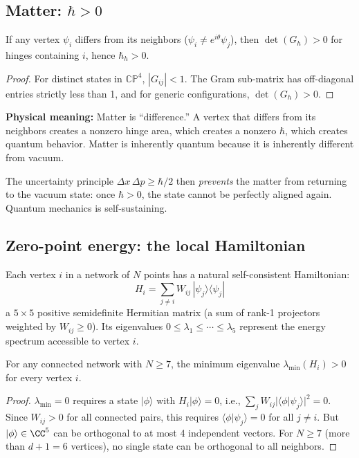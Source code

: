 \subsection{Matter: $\hbar > 0$}

\begin{proposition}
If any vertex $\psi_i$ differs from its neighbors ($\psi_i \neq e^{i\theta}\psi_j$), then $\det(G_h) > 0$ for hinges containing $i$, hence $\hbar_h > 0$.
\end{proposition}

\begin{proof}
For distinct states in $\mathbb{CP}^4$, $|G_{ij}| < 1$. The Gram sub-matrix has off-diagonal entries strictly less than 1, and for generic configurations, $\det(G_h) > 0$.
\end{proof}

\textbf{Physical meaning:} Matter is ``difference.'' A vertex that differs from its neighbors creates a nonzero hinge area, which creates a nonzero $\hbar$, which creates quantum behavior. Matter is inherently quantum because it is inherently different from vacuum.

The uncertainty principle $\Delta x\,\Delta p \geq \hbar/2$ then \emph{prevents} the matter from returning to the vacuum state: once $\hbar > 0$, the state cannot be perfectly aligned again. Quantum mechanics is self-sustaining.

\subsection{Zero-point energy: the local Hamiltonian}

Each vertex $i$ in a network of $N$ points has a natural self-consistent Hamiltonian:
\begin{equation}
H_i = \sum_{j \neq i} W_{ij}\,|\psi_j\rangle\langle\psi_j|
\end{equation}
a $5\times 5$ positive semidefinite Hermitian matrix (a sum of rank-1 projectors weighted by $W_{ij} \geq 0$). Its eigenvalues $0 \leq \lambda_1 \leq \cdots \leq \lambda_5$ represent the energy spectrum accessible to vertex $i$.

\begin{proposition}
For any connected network with $N \geq 7$, the minimum eigenvalue $\lambda_{\min}(H_i) > 0$ for every vertex $i$.
\end{proposition}

\begin{proof}
$\lambda_{\min} = 0$ requires a state $|\phi\rangle$ with $H_i|\phi\rangle = 0$, i.e., $\sum_j W_{ij}|\langle\phi|\psi_j\rangle|^2 = 0$. Since $W_{ij} > 0$ for all connected pairs, this requires $\langle\phi|\psi_j\rangle = 0$ for all $j \neq i$. But $|\phi\rangle \in \CC^5$ can be orthogonal to at most 4 independent vectors. For $N \geq 7$ (more than $d + 1 = 6$ vertices), no single state can be orthogonal to all neighbors.
\end{proof}

